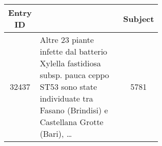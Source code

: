 \begin{table}[!htbp]
  \begin{tabular}{|c|p{0.6\linewidth}|c|}
    \hline
    \textbf{Entry ID} & \textbf{\trafilaturaFulltext{}} & \textbf{Subject} \\
    \hline
    32437 & Altre 23 piante infette dal batterio Xylella fastidiosa subsp. pauca ceppo ST53 sono state individuate tra Fasano (Brindisi) e Castellana Grotte (Bari), \ldots %
    & 5781 \\

\end{tabular}
\end{table}

